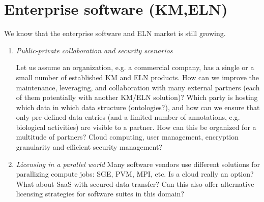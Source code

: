 \documentclass{sig-alternate}
\begin{document}
\section*{Enterprise software (KM,ELN)}
We know that the enterprise software and ELN market is still growing.
\begin{enumerate}
\item \emph{Public-private collaboration and security scenarios}

  Let us assume an organization, e.g. a commercial company, has a
  single or a small number of established KM and ELN products.  How
  can we improve the maintenance, leveraging, and collaboration with
  many external partners (each of them potentially with another KM/ELN
  solution)? Which party is hosting which data in which data structure
  (ontologies?), and how can we ensure that only pre-defined data
  entries (and a limited number of annotations, e.g. biological
  activities) are visible to a partner.  How can this be organized for
  a multitude of partners? Cloud computing, user management,
  encryption granularity and efficient security management?

\item \emph{Licensing in a parallel world} Many software vendors use
  different solutions for parallizing compute jobs: SGE, PVM, MPI,
  etc.  Is a cloud really an option?  What about SaaS with secured data
  transfer?  Can this also offer alternative licensing strategies for
  software suites in this domain?


\end{enumerate}



\end{document}
